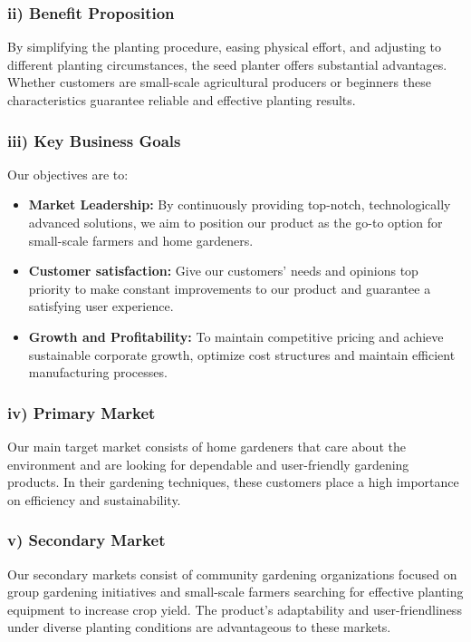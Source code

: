 \subsubsection*{ii) Benefit Proposition}
By simplifying the planting procedure, easing physical effort, and adjusting to different planting circumstances, the seed planter offers substantial advantages. Whether customers are small-scale agricultural producers or beginners these characteristics guarantee reliable and effective planting results.

\subsubsection*{iii) Key Business Goals}
Our objectives are to:
\begin{itemize}
    \item \textbf{Market Leadership:} By continuously providing top-notch, technologically advanced solutions, we aim to position our product as the go-to option for small-scale farmers and home gardeners.
    \item \textbf{Customer satisfaction:} Give our customers' needs and opinions top priority to make constant improvements to our product and guarantee a satisfying user experience.
    \item \textbf{Growth and Profitability:} To maintain competitive pricing and achieve sustainable corporate growth, optimize cost structures and maintain efficient manufacturing processes.
\end{itemize}

\subsubsection*{iv) Primary Market}
Our main target market consists of home gardeners that care about the environment and are looking for dependable and user-friendly gardening products. In their gardening techniques, these customers place a high importance on efficiency and sustainability.

\subsubsection*{v) Secondary Market}
Our secondary markets consist of community gardening organizations focused on group gardening initiatives and small-scale farmers searching for effective planting equipment to increase crop yield. The product's adaptability and user-friendliness under diverse planting conditions are advantageous to these markets.

